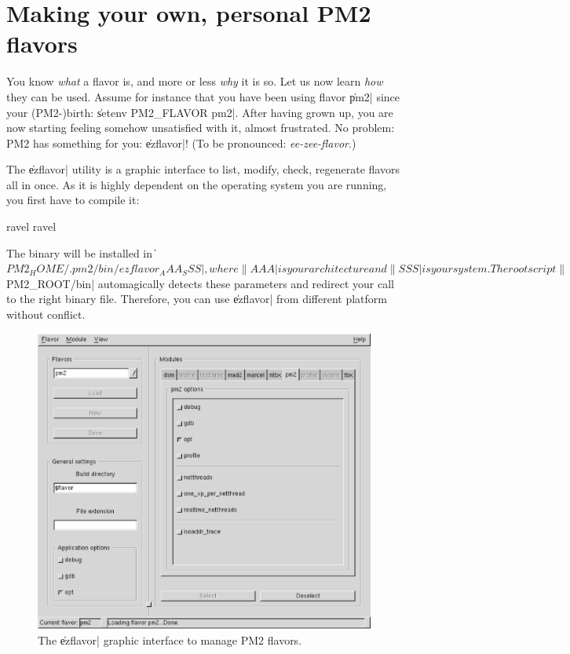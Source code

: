 \section{Making your own, personal PM2 flavors}

You know \emph{what} a flavor is, and more or less \emph{why} it is
so. Let us now learn \emph{how} they can be used. Assume for instance
that you have been using flavor \|pm2| since your (PM2-)birth:
\|setenv PM2_FLAVOR pm2|. After having grown up, you are now starting
feeling somehow unsatisfied with it, almost frustrated. No problem:
PM2 has something for you: \|ezflavor|! (To be pronounced:
\emph{ee-zee-flavor}.)

The \|ezflavor| utility is a graphic interface to list, modify, check,
regenerate flavors all in once. As it is highly dependent on the
operating system you are running, you first have to compile it:
\begin{shell}
ravel%
ravel%
\end{shell}
The binary will be installed in
\|${PM2_HOME}/.pm2/bin/ezflavor_AAA_SSS|, where \|AAA| is your
architecture and \|SSS| is your system. The root script
\|${PM2_ROOT}/bin| automagically detects these parameters and redirect
your call to the right binary file.  Therefore, you can use \|ezflavor|
from different platform without conflict.

\begin{figure}
\begin{center}
\includegraphics[width=0.7\linewidth]{Figures/ezflavor.eps}
\end{center}
\caption{The \|ezflavor| graphic interface to manage PM2 flavors.}
\label{fig:ezflavor}
\end{figure}

